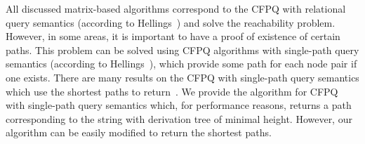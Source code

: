 All discussed matrix-based algorithms correspond to the CFPQ with relational query semantics (according to Hellings~\cite{hellingsRelational}) and solve the reachability problem. However, in some areas, it is important to have a proof of existence of certain paths. This problem can be solved using CFPQ algorithms with single-path query semantics (according to Hellings~\cite{hellingsPathQuerying}), which provide some path for each node pair if one exists. There are many results on the CFPQ with single-path query semantics which use the shortest paths to return~\cite{hellingsPathQuerying,barrett2000formal,bradford2007quickest,ward2010complexity}. We provide the algorithm for CFPQ with single-path query semantics which, for performance reasons, returns a path corresponding to the string with derivation tree of minimal height. However, our algorithm can be easily modified to return the shortest paths. 

